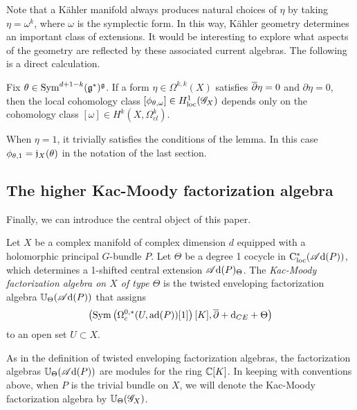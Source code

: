 Note that a K\"{a}hler manifold always produces natural choices of $\eta$ by taking $\eta = \omega^{k}$, where $\omega$ is the symplectic form.
In this way, K\"{a}hler geometry determines an important class of extensions.
It would be interesting to explore what aspects of the geometry are reflected by these associated current algebras.
The following is a direct calculation.

\begin{lem}\label{lem: cocycle KM}
Fix $\theta \in {\rm Sym}^{d+1-k}(\mathfrak g^*)^\mathfrak g$.
If a form $\eta \in \Omega^{k,k}(X)$ satisfies $\overline{\partial} \eta = 0$ and $\partial \eta = 0$,
then the local cohomology class $[\phi_{\theta,\omega}] \in H^1_{\rm loc}(\mathscr G_X)$  depends only on the cohomology class $[\omega] \in H^{k}(X , \Omega^k_{cl})$.
\end{lem}

When $\eta = 1$, it trivially satisfies the conditions of the lemma. 
In this case $\phi_{\theta, 1} = \mathfrak j_X(\theta)$ in the notation of the last section. 


\subsection{The higher Kac-Moody factorization algebra}

Finally, we can introduce the central object of this paper.

\begin{dfn}
Let $X$ be a complex manifold of complex dimension $d$ equipped with a holomorphic principal $G$-bundle $P$.
Let $\Theta$ be a degree 1 cocycle in ${\rm C}_{\rm loc}^*(\mathscr A{\rm d}(P))$, 
which determines a 1-shifted central extension $\mathscr A{\rm d}(P)_\Theta$.
The {\em Kac-Moody factorization algebra on $X$ of type $\Theta$} is the twisted enveloping factorization algebra $\mathbb U_\Theta (\mathscr A{\rm d}(P))$ that assigns
\[
\left({\rm Sym}\left(\Omega^{0,*}_c(U, {\rm ad}(P))[1]\right) [K] , \overline{\partial} + {\rm d}_{CE} + \Theta\right) 
\]
to an open set $U \subset X$.
\end{dfn}

\begin{rmk} 
As in the definition of twisted enveloping factorization algebras, the factorization algebras $\mathbb U_\Theta(\mathscr A{\rm d}(P))$ are modules for the ring $\mathbb C[K]$. 
In keeping with conventions above, when $P$ is the trivial bundle on $X$, 
we will denote the Kac-Moody factorization algebra by $\mathbb U_\Theta(\mathscr G_X)$. 
\end{rmk}

